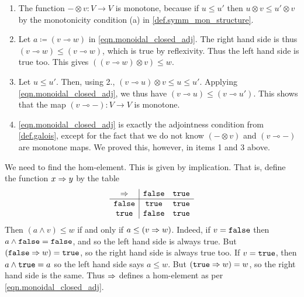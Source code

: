 \documentclass[7Sketches]{subfiles}
\begin{document}
{
\begin{enumerate}
\item The function $-\otimes v\colon V \to V$ is monotone, because if $u \le u'$ then
$u \otimes v \le u' \otimes v$ by the monotonicity condition (a) in
\cref{def.symm_mon_structure}.
\item Let $a\coloneqq(v \multimap w)$ in
\cref{eqn.monoidal_closed_adj}. The right hand side is thus $(v \multimap w) \leq
(v \multimap w)$, which is true by reflexivity. Thus the left hand side is true
too. This gives $((v \multimap w) \otimes v) \le w$.
\item Let $u \le u'$. Then, using 2., $(v \multimap u) \otimes v \le u \le u'$.
Applying \cref{eqn.monoidal_closed_adj}, we thus have $(v \multimap u) \le (v
\multimap u')$. This shows that the map $(v \multimap -)\colon V \to V$ is
monotone.
\item \cref{eqn.monoidal_closed_adj} is exactly the adjointness condition from
\cref{def.galois}, except for the fact that we do not know $(-\otimes v)$ and $(v
\multimap-)$ are monotone maps. We proved this, however, in items 1 and 3 above.
\end{enumerate}
}

{
We need to find the hom-element. This is given by implication. That is, define
the function $x \Rightarrow y$ by the table
\[
\begin{array}{c | c c}
	\Rightarrow &\mathtt{false}&\mathtt{true}\\\hline
	\mathtt{false}&\mathtt{true}&\mathtt{true}\\
	\mathtt{true}&\mathtt{false}&\mathtt{true}
\end{array}
\]
Then $(a \wedge v) \le w$ if and only if $a \le (v \Rightarrow w)$. Indeed,
if $v=\mathtt{false}$ then $a\wedge \mathtt{false} = \mathtt{false}$, and so the left hand side is
always true. But $(\mathtt{false} \Rightarrow w) = \mathtt{true}$, so the right hand side is
always true too. If $v =\mathtt{true}$, then $a \wedge \mathtt{true} = a$ so the left hand side
says $a \le w$. But $(\mathtt{true} \Rightarrow w) = w$, so the right hand side is the
same. Thus $\Rightarrow$ defines a hom-element as per
\cref{eqn.monoidal_closed_adj}.
}
\end{document}
